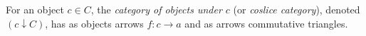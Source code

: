 For an object $c \in C$, the \emph{category of objects under $c$} (or \emph{coslice category}), denoted $(c \downarrow C)$, has as objects arrows $f: c \to a$ and as arrows commutative triangles.
